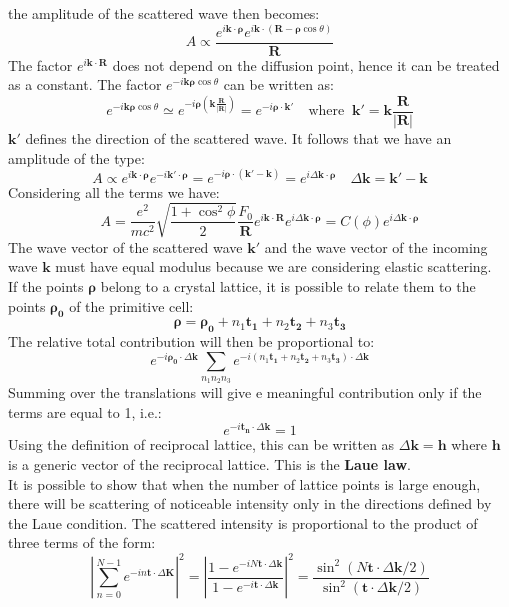 \documentclass[10.75pt,a4paper,openright,bottom=2cm]{article}
\renewcommand{\Vec}[1]{\boldsymbol{#1}}
\begin{document}
the amplitude of the scattered wave then becomes:
\[
A\propto\frac{e^{i\Vec{k}\cdot\Vec{\rho}}e^{i\Vec{k}\cdot(\Vec{R}-\Vec{\rho}\cos\theta)}}{\Vec{R}}
\]
The factor $e^{i\Vec{k}\cdot\Vec{R}}$ does not depend on the diffusion point, hence it can be treated as a constant. The factor $e^{-i\Vec{k}\Vec{\rho}\cos\theta}$ can be written as:
\[
e^{-i\Vec{k}\Vec{\rho}\cos\theta}\simeq e^{-i\Vec{\rho}\left(\Vec{k}\frac{\Vec{R}}{|\Vec{R}|}\right)}=e^{-i\Vec{\rho}\cdot\Vec{k}'} \quad \text{where}\;\;\Vec{k}'=\Vec{k}\frac{\Vec{R}}{|\Vec{R}|}
\]
$\Vec{k}'$ defines the direction of the scattered wave. It follows that we have an amplitude of the type:
\[
A\propto e^{i\Vec{k}\cdot\Vec{\rho}}e^{-i\Vec{k}'\cdot\Vec{\rho}}=e^{-i\Vec{\rho}\cdot(\Vec{k}'-\Vec{k})}=e^{i\Delta\Vec{k}\cdot\Vec{\rho}} \quad \Delta\Vec{k}=\Vec{k}'-\Vec{k}
\]
Considering all the terms we have:
\[
A=\frac{e^2}{mc^2}\sqrt{\frac{1+\cos^2\phi}{2}}\frac{F_0}{\Vec{R}}e^{i\Vec{k}\cdot\Vec{R}}e^{i\Delta\Vec{k}\cdot\Vec{\rho}}=C(\phi)e^{i\Delta\Vec{k}\cdot\Vec{\rho}}
\]
The wave vector of the scattered wave $\Vec{k}'$ and the wave vector of the incoming wave $\Vec{k}$ must have equal modulus because we are considering elastic scattering.\\
If the points $\Vec{\rho}$ belong to a crystal lattice, it is possible to relate them to the points $\Vec{\rho_0}$ of the primitive cell:
\[
\Vec{\rho}=\Vec{\rho_0}+n_1\Vec{t_1}+n_2\Vec{t_2}+n_3\Vec{t_3}
\]
The relative total contribution will then be proportional to:
\begin{equation}
\label{rhozero}
e^{-i\Vec{\rho_0}\cdot\Delta\Vec{k}}\sum_{n_1n_2n_3}e^{-i(n_1\Vec{t_1}+n_2\Vec{t_2}+n_3\Vec{t_3})\cdot\Delta\Vec{k}}
\end{equation}
Summing over the translations will give e meaningful contribution only if the terms are equal to 1, i.e.:
\[
e^{-i\Vec{t_n}\cdot\Delta\Vec{k}}=1
\]
Using the definition of reciprocal lattice, this can be written as $\Delta\Vec{k}=\Vec{h}$ where $\Vec{h}$ is a generic vector of the reciprocal lattice. This is the \textbf{Laue law}.\\
It is possible to show that when the number of lattice points is large enough, there will be scattering of noticeable intensity only in the directions defined by the Laue condition. The scattered intensity is proportional to the product of three terms of the form:
\[
\left|\sum_{n=0}^{N-1}e^{-in\Vec{t}\cdot\Delta\Vec{K}}\right|^2=\left|\frac{1-e^{-iN\Vec{t}\cdot\Delta\Vec{k}}}{1-e^{-i\Vec{t}\cdot\Delta\Vec{k}}}\right|^2=\frac{\sin^2(N\Vec{t}\cdot\Delta\Vec{k}/2)}{\sin^2(\Vec{t}\cdot\Delta\Vec{k}/2)}
\]
\end{document}
